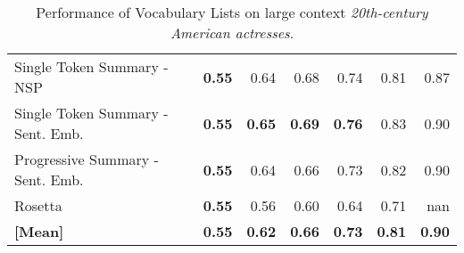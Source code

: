 \begin{table}[H]
{\begin{tabular}{lrrrrrr}
Single Token Summary - NSP & \cellcolor[RGB]{58,76,192}\textbf{0.55} & \cellcolor[RGB]{135,170,252}0.64 & \cellcolor[RGB]{175,202,251}0.68 & \cellcolor[RGB]{225,218,214}0.74 & \cellcolor[RGB]{246,166,135}0.81 & \cellcolor[RGB]{218,90,72}0.87 \\
Single Token Summary - Sent. Emb. & \cellcolor[RGB]{58,76,192}\textbf{0.55} & \cellcolor[RGB]{144,178,254}\textbf{0.65} & \cellcolor[RGB]{183,207,249}\textbf{0.69} & \cellcolor[RGB]{236,210,196}\textbf{0.76} & \cellcolor[RGB]{240,141,111}0.83 & \cellcolor[RGB]{191,40,46}0.90 \\
Progressive Summary - Sent. Emb. & \cellcolor[RGB]{58,76,192}\textbf{0.55} & \cellcolor[RGB]{134,169,252}0.64 & \cellcolor[RGB]{160,191,254}0.66 & \cellcolor[RGB]{219,220,222}0.73 & \cellcolor[RGB]{244,154,123}0.82 & \cellcolor[RGB]{190,35,45}0.90 \\
Rosetta & \cellcolor[RGB]{58,76,192}\textbf{0.55} & \cellcolor[RGB]{60,79,195}0.56 & \cellcolor[RGB]{97,130,234}0.60 & \cellcolor[RGB]{134,169,252}0.64 & \cellcolor[RGB]{199,214,240}0.71 & \cellcolor[RGB]{0,0,0}nan \\
\midrule 
\textbf{[Mean]} & \textbf{0.55} & \textbf{0.62} & \textbf{0.66} & \textbf{0.73} & \textbf{0.81} & \textbf{0.90} \\
\bottomrule
\end{tabular}
    }
        \caption{Performance of Vocabulary Lists on large context \textit{20th-century American actresses}.}\end{table}

